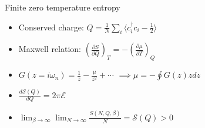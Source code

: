 \begin{frame}{Finite zero temperature entropy}


\begin{itemize}
    \item Conserved charge: $Q = \frac{1}{N} \sum_i \langle c_i^{\dagger} c_i - \frac{1}{2} \rangle$

    \vspace{0.5cm}
    
    \item Maxwell relation: $(\frac{\partial S}{\partial Q})_T = -(\frac{\partial \mu}{\partial T})_Q$

    \vspace{0.5cm}

    \item $G(z = i \omega_n) = \frac{1}{z} - \frac{\mu}{z^2} + \cdots$ $\implies \mu = - \oint G(z) z dz$


    \vspace{0.5cm}

    \item $\frac{d \mathcal{S}(Q)}{d Q}=2 \pi \mathcal{E}$
    
    \vspace{0.5cm}
    
    \item $\lim _{\beta \rightarrow \infty} \lim _{N \rightarrow \infty} \frac{S\left(N, Q, \beta \right)}{N}=\mathcal{S}(Q)>0$
\end{itemize}




\end{frame}
